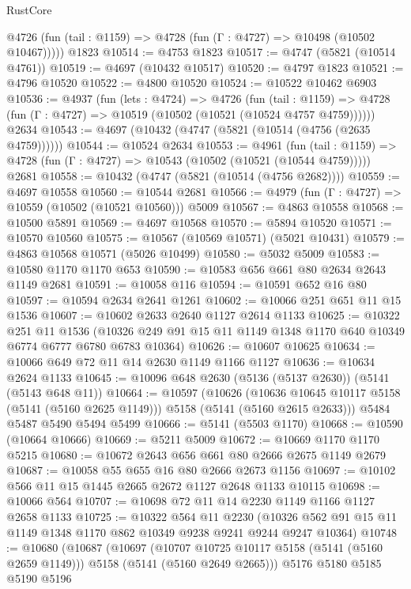 \begin{lexlean}{RustCore}
\begin{coremodule}
      @4726 (fun (tail : @1159) => @4728 (fun (Γ : @4727) => @10498 (@10502 @10467)))))
    @1823
@10514 := @4753 @1823
@10517 := @4747 (@5821 (@10514 @4761))
@10519 := @4697 (@10432 @10517)
@10520 := @4797 @1823
@10521 := @4796 @10520
@10522 := @4800 @10520
@10524 := @10522 @10462 @6903
@10536 := @4937
    (fun (lets : @4724) =>
    @4726
      (fun (tail : @1159) =>
      @4728 (fun (Γ : @4727) => @10519 (@10502 (@10521 (@10524 @4757 @4759))))))
    @2634
@10543 := @4697 (@10432 (@4747 (@5821 (@10514 (@4756 (@2635 @4759))))))
@10544 := @10524 @2634
@10553 := @4961
    (fun (tail : @1159) => @4728 (fun (Γ : @4727) => @10543 (@10502 (@10521 (@10544 @4759)))))
    @2681
@10558 := @10432 (@4747 (@5821 (@10514 (@4756 @2682))))
@10559 := @4697 @10558
@10560 := @10544 @2681
@10566 := @4979 (fun (Γ : @4727) => @10559 (@10502 (@10521 @10560))) @5009
@10567 := @4863 @10558
@10568 := @10500 @5891
@10569 := @4697 @10568
@10570 := @5894 @10520
@10571 := @10570 @10560
@10575 := @10567 (@10569 @10571) (@5021 @10431)
@10579 := @4863 @10568 @10571 (@5026 @10499)
@10580 := @5032 @5009
@10583 := @10580 @1170 @1170 @653
@10590 := @10583 @656 @661 @80 @2634 @2643 @1149 @2681
@10591 := @10058 @116
@10594 := @10591 @652 @16 @80
@10597 := @10594 @2634 @2641 @1261
@10602 := @10066 @251 @651 @11 @15 @1536
@10607 := @10602 @2633 @2640 @1127 @2614 @1133
@10625 := @10322
    @251
    @11
    @1536
    (@10326 @249 @91 @15 @11 @1149 @1348 @1170 @640 @10349 @6774 @6777 @6780 @6783 @10364)
@10626 := @10607 @10625
@10634 := @10066 @649 @72 @11 @14 @2630 @1149 @1166 @1127
@10636 := @10634 @2624 @1133
@10645 := @10096 @648 @2630 (@5136 (@5137 @2630)) (@5141 (@5143 @648 @11))
@10664 := @10597
    (@10626
      (@10636 @10645 @10117 @5158 (@5141 (@5160 @2625 @1149)))
      @5158
      (@5141 (@5160 @2615 @2633)))
    @5484
    @5487
    @5490
    @5494
    @5499
@10666 := @5141 (@5503 @1170)
@10668 := @10590 (@10664 @10666)
@10669 := @5211 @5009
@10672 := @10669 @1170 @1170 @5215
@10680 := @10672 @2643 @656 @661 @80 @2666 @2675 @1149 @2679
@10687 := @10058 @55 @655 @16 @80 @2666 @2673 @1156
@10697 := @10102 @566 @11 @15 @1445 @2665 @2672 @1127 @2648 @1133 @10115
@10698 := @10066 @564
@10707 := @10698 @72 @11 @14 @2230 @1149 @1166 @1127 @2658 @1133
@10725 := @10322
    @564
    @11
    @2230
    (@10326 @562 @91 @15 @11 @1149 @1348 @1170 @862 @10349 @9238 @9241 @9244 @9247 @10364)
@10748 := @10680
    (@10687
      (@10697
        (@10707 @10725 @10117 @5158 (@5141 (@5160 @2659 @1149)))
        @5158
        (@5141 (@5160 @2649 @2665)))
      @5176
      @5180
      @5185
      @5190
      @5196

\end{coremodule}
\end{lexlean}
